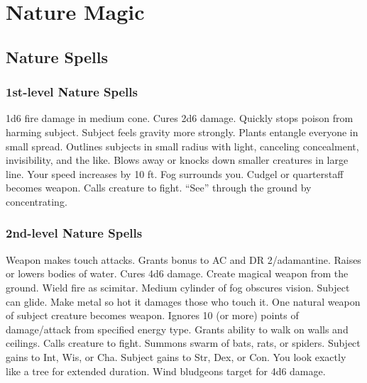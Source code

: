 \section{Nature Magic}\label{Nature Magic}
\subsection{Nature Spells}\label{Nature Spells}

\subsubsection{1st-level Nature Spells}
\begin{spelllist}
     1d6 fire damage in medium cone.
     Cures 2d6 damage.
     Quickly stops poison from harming subject.
     Subject feels gravity more strongly.
     Plants entangle everyone in small spread.
     Outlines subjects in small radius with light, canceling concealment, invisibility, and the like.
     Blows away or knocks down smaller creatures in large line.
     Your speed increases by 10 ft.
     Fog surrounds you.
     Cudgel or quarterstaff becomes  weapon.
     Calls creature to fight.
     ``See'' through the ground by concentrating.
\end{spelllist}

\subsubsection{2nd-level Nature Spells}
\begin{spelllist}
     Weapon makes touch attacks. 
     Grants  bonus to AC and DR 2/adamantine.
     Raises or lowers bodies of water.
     Cures 4d6 damage.
     Create magical weapon from the ground.
     Wield fire as scimitar.
     Medium cylinder of fog obscures vision.
     Subject can glide.
     Make metal so hot it damages those who touch it.
     One natural weapon of subject creature becomes  weapon.
     Ignores 10 (or more) points of damage/attack from specified energy type.
     Grants ability to walk on walls and ceilings.
     Calls creature to fight.
     Summons swarm of bats, rats, or spiders.
     Subject gains  to Int, Wis, or Cha.
     Subject gains  to Str, Dex, or Con.
     You look exactly like a tree for extended duration.
     Wind bludgeons target for 4d6 damage.
\end{spelllist}

